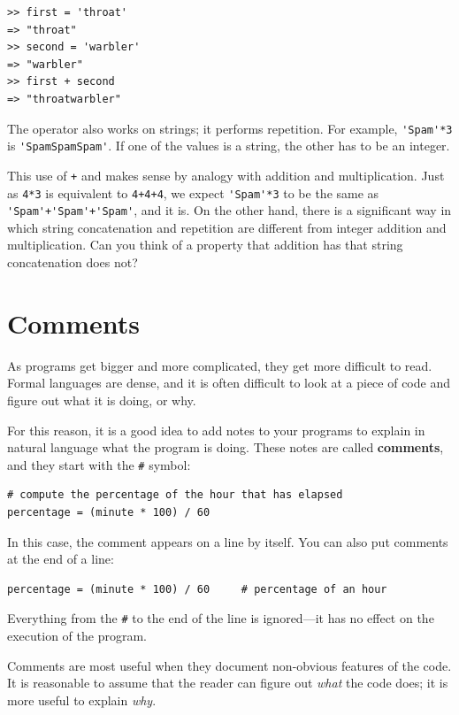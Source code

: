 \documentclass[10pt]{book}
\begin{document}
\begin{verbatim}
>> first = 'throat'
=> "throat"
>> second = 'warbler'
=> "warbler"
>> first + second
=> "throatwarbler"
\end{verbatim}
%
The {\tt *} operator also works on strings; it performs repetition.
For example, \verb"'Spam'*3" is \verb"'SpamSpamSpam'".  If one of the
values is a string, the other has to be an integer.

This use of {\tt +} and {\tt *} makes sense by
analogy with addition and multiplication.  Just as {\tt 4*3} is
equivalent to {\tt 4+4+4}, we expect \verb"'Spam'*3" to be the same as
\verb"'Spam'+'Spam'+'Spam'", and it is.  On the other hand, there is a
significant way in which string concatenation and repetition are
different from integer addition and multiplication.
Can you think of a property that addition has
that string concatenation does not?


\section{Comments}

As programs get bigger and more complicated, they get more difficult
to read.  Formal languages are dense, and it is often difficult to
look at a piece of code and figure out what it is doing, or why.

For this reason, it is a good idea to add notes to your programs to explain
in natural language what the program is doing.  These notes are called
{\bf comments}, and they start with the \verb"#" symbol:

\begin{verbatim}
# compute the percentage of the hour that has elapsed
percentage = (minute * 100) / 60
\end{verbatim}
%
In this case, the comment appears on a line by itself.  You can also put
comments at the end of a line:

\begin{verbatim}
percentage = (minute * 100) / 60     # percentage of an hour
\end{verbatim}
%
Everything from the {\tt \#} to the end of the line is ignored---it
has no effect on the execution of the program.

Comments are most useful when they document non-obvious features of
the code.  It is reasonable to assume that the reader can figure out
{\em what} the code does; it is more useful to explain {\em why}.
\end{document}

